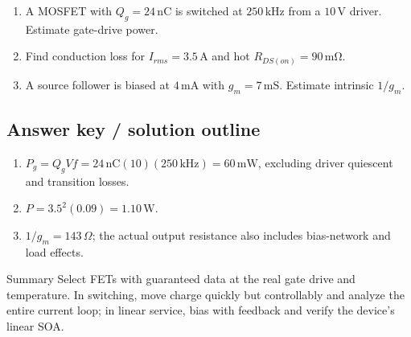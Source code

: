 \documentclass[10pt,letterpaper]{article}
\begin{document}
\begin{enumerate}
  \item A MOSFET with $Q_g=24\,\mathrm{nC}$ is switched at $250\,\mathrm{kHz}$ from a $10\,\mathrm{V}$ driver. Estimate gate-drive power.
  \item Find conduction loss for $I_{rms}=3.5\,\mathrm{A}$ and hot $R_{DS(on)}=90\,\mathrm{m\Omega}$.
  \item A source follower is biased at $4\,\mathrm{mA}$ with $g_m=7\,\mathrm{mS}$. Estimate intrinsic $1/g_m$.
\end{enumerate}\subsection{Answer key / solution outline}
\begin{enumerate}
  \item $P_g=Q_gVf=24\,\mathrm{nC}(10)(250\,\mathrm{kHz})=60\,\mathrm{mW}$, excluding driver quiescent and transition losses.
  \item $P=3.5^2(0.09)=1.10\,\mathrm{W}$.
  \item $1/g_m=143\,\Omega$; the actual output resistance also includes bias-network and load effects.
\end{enumerate}\begin{CornellSummaryBox}{Summary}
Select FETs with guaranteed data at the real gate drive and temperature. In switching, move charge quickly but controllably and analyze the entire current loop; in linear service, bias with feedback and verify the device's linear SOA.
\end{CornellSummaryBox}
\end{document}
